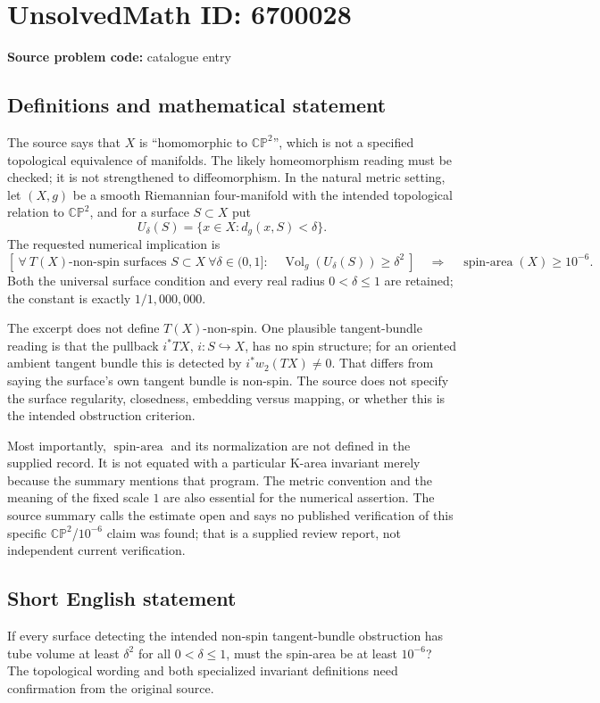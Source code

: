 \documentclass[11pt]{article}
\begin{document}
\section*{UnsolvedMath ID: 6700028}
\textbf{Source problem code:} catalogue entry
\subsection{Definitions and mathematical statement}
The source says that \(X\) is ``homomorphic to \(\mathbb{CP}^2\)'', which is not a specified topological equivalence of manifolds. The likely homeomorphism reading must be checked; it is not strengthened to diffeomorphism. In the natural metric setting, let \((X,g)\) be a smooth Riemannian four-manifold with the intended topological relation to \(\mathbb{CP}^2\), and for a surface \(S\subset X\) put
\[
 U_\delta(S)=\{x\in X:d_g(x,S)<\delta\}.
\]
The requested numerical implication is
\[
 \left[\ \forall\ T(X)\text{-non-spin surfaces }S\subset X\ 
 \forall\delta\in(0,1]:\quad
 \operatorname{Vol}_g(U_\delta(S))\ge\delta^2\ \right]
 \quad\Longrightarrow\quad
 \operatorname{spin\text{-}area}(X)\ge10^{-6}.
\]
Both the universal surface condition and every real radius \(0<\delta\le1\) are retained; the constant is exactly \(1/1{,}000{,}000\).

The excerpt does not define \(T(X)\)-non-spin. One plausible tangent-bundle reading is that the pullback \(i^*TX\), \(i:S\hookrightarrow X\), has no spin structure; for an oriented ambient tangent bundle this is detected by \(i^*w_2(TX)\ne0\). That differs from saying the surface's own tangent bundle is non-spin. The source does not specify the surface regularity, closedness, embedding versus mapping, or whether this is the intended obstruction criterion.

Most importantly, \(\operatorname{spin\text{-}area}\) and its normalization are not defined in the supplied record. It is not equated with a particular K-area invariant merely because the summary mentions that program. The metric convention and the meaning of the fixed scale \(1\) are also essential for the numerical assertion. The source summary calls the estimate open and says no published verification of this specific \(\mathbb{CP}^2\)/\(10^{-6}\) claim was found; that is a supplied review report, not independent current verification.
\subsection{Short English statement}
If every surface detecting the intended non-spin tangent-bundle obstruction has tube volume at least \(\delta^2\) for all \(0<\delta\le1\), must the spin-area be at least \(10^{-6}\)? The topological wording and both specialized invariant definitions need confirmation from the original source.
\end{document}
